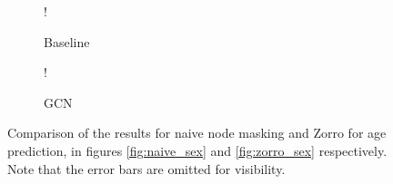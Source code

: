 \begin{figure}[H]
    \centering
        \begin{subfigure}{.5\textwidth}
            \centering
            \begin{center}
                \resizebox {1.0\linewidth} {!} {
                    
                }
            \end{center}
            \caption{Baseline}
            \label{fig:comparison_age_naive}
        \end{subfigure}%
        \begin{subfigure}{.5\textwidth}
            \centering
            \begin{center}
                \resizebox {1.0\linewidth} {!} {
                    
                }
            \end{center}
            \caption{GCN}
            \label{fig:comparison_age_zorro}
        \end{subfigure}
    \caption{Comparison of the results for naive node masking and Zorro for age prediction, in figures \ref{fig:naive_sex} and \ref{fig:zorro_sex} respectively. Note that the error bars are omitted for visibility.}
    \label{fig:comparison_age}
\end{figure}
